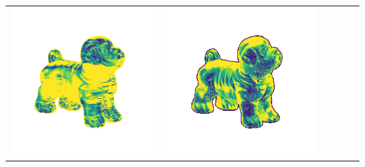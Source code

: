 \begin{center}
\begin{tabularx}{\linewidth}{@{}Y@{}Y@{}Y@{}Y@{}Y@{}Y@{}}
\includegraphics[width=\linewidth]{semisynthetic/20150514_17_yu_err.png} &
\includegraphics[width=\linewidth]{semisynthetic/20150514_17_dpsn_err.png} &

\end{tabularx}
\end{center}
